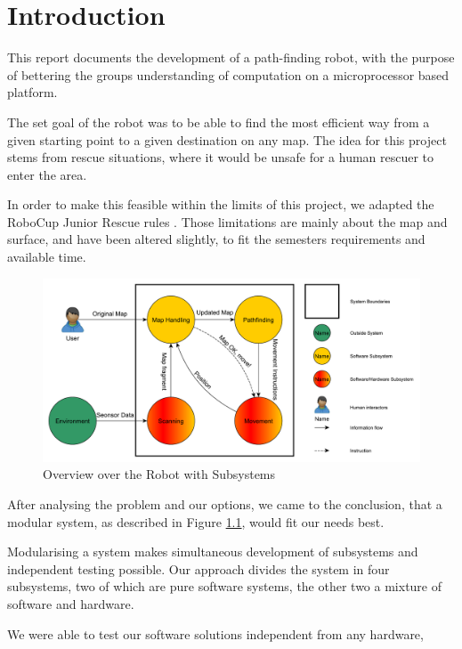 \chapter{Introduction}\label{ch:introduction}
This report documents the development of a path-finding robot,
with the purpose of bettering the groups understanding of computation on a microprocessor based platform.

The set goal of the robot was to be able to find the most efficient way
from a given starting point to a given destination on any map.
The idea for this project stems from rescue situations,
where it would be unsafe for a human rescuer to enter the area.

In order to make this feasible within the limits of this project,
we adapted the RoboCup Junior Rescue rules \cite{Robocup}.
Those limitations are mainly about the map and surface,
and have been altered slightly,
to fit the semesters requirements and available time.

\begin{figure}[!ht]
	\centering
	\includegraphics[width=\textwidth]{figures/intro/systemview}
	\caption{Overview over the Robot with Subsystems}
	\label{fig:system} 
\end{figure}
After analysing the problem and our options,
we came to the conclusion,
that a modular system,
as described in Figure \ref{fig:system},
would fit our needs best.

Modularising a system makes simultaneous development of subsystems
and independent testing possible.
Our approach divides the system in four subsystems,
two of which are pure software systems,
the other two a mixture of software and hardware.

We were able to test our software solutions independent from any hardware,




